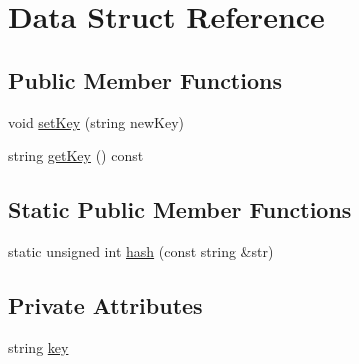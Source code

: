 \hypertarget{struct_data}{\section{Data Struct Reference}
\label{struct_data}
}
\subsection*{Public Member Functions}
\begin{DoxyCompactItemize}
\item 
void \hyperlink{struct_data_a59bc7ecf5b7d3d4f358f87c87f62bcc3}{set\+Key} (string new\+Key)
\item 
string \hyperlink{struct_data_aeca168b691885c7eb893f01ed54dabd9}{get\+Key} () const 
\end{DoxyCompactItemize}
\subsection*{Static Public Member Functions}
\begin{DoxyCompactItemize}
\item 
static unsigned int \hyperlink{struct_data_af98f6d2d78472b7c6f5ab7d7c9357d99}{hash} (const string \&str)
\end{DoxyCompactItemize}
\subsection*{Private Attributes}
\begin{DoxyCompactItemize}
\item 
string \hyperlink{struct_data_adabe322de5988733fce4b0b9c853d5f2}{key}
\end{DoxyCompactItemize}


